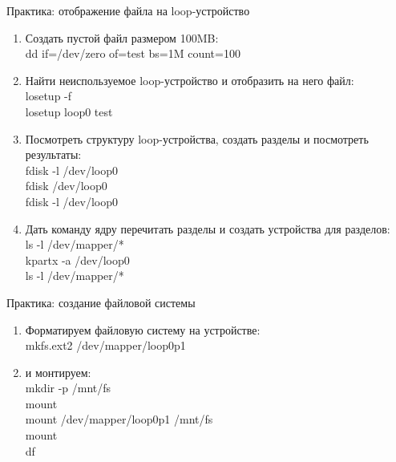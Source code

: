 \begin{frame}{Практика: отображение файла на loop-устройство}
	\begin{enumerate}
		\item Создать пустой файл размером 100MB: \\
			dd if=/dev/zero of=test bs=1M count=100
			\pause
		\item Найти неиспользуемое loop-устройство и отобразить на него файл:\\
			losetup -f \\
			losetup loop0 test
			\pause
		\item Посмотреть структуру loop-устройства, создать разделы и посмотреть результаты:\\
			fdisk -l /dev/loop0 \\
			fdisk /dev/loop0 \\
			fdisk -l /dev/loop0
			\pause
		\item Дать команду ядру перечитать разделы и создать устройства для разделов:\\
			ls -l /dev/mapper/* \\
			kpartx -a /dev/loop0 \\
			ls -l /dev/mapper/* \\
	\end{enumerate}
\end{frame}

\begin{frame}{Практика: создание файловой системы}
	\begin{enumerate}
		\item Форматируем файловую систему на устройстве: \\
			mkfs.ext2 /dev/mapper/loop0p1
			\pause
		\item и монтируем:\\
			mkdir -p /mnt/fs\\
			mount\\
			mount /dev/mapper/loop0p1 /mnt/fs\\
			mount\\
			df
			\pause
	\end{enumerate}
\end{frame}


